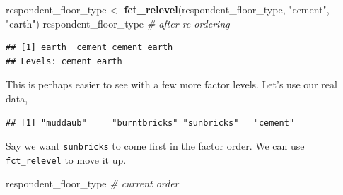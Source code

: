\documentclass[]{book}
\newenvironment{Shaded}{\begin{snugshade}}{\end{snugshade}}
\newcommand{\KeywordTok}[1]{\textcolor[rgb]{0.13,0.29,0.53}{\textbf{#1}}}
\newcommand{\StringTok}[1]{\textcolor[rgb]{0.31,0.60,0.02}{#1}}
\newcommand{\CommentTok}[1]{\textcolor[rgb]{0.56,0.35,0.01}{\textit{#1}}}
\newcommand{\OperatorTok}[1]{\textcolor[rgb]{0.81,0.36,0.00}{\textbf{#1}}}
\newcommand{\NormalTok}[1]{#1}
\begin{document}
\begin{Shaded}
\begin{Highlighting}[]
\NormalTok{respondent_floor_type <-}\StringTok{ }\KeywordTok{fct_relevel}\NormalTok{(respondent_floor_type, }\StringTok{"cement"}\NormalTok{, }\StringTok{"earth"}\NormalTok{)}
\NormalTok{respondent_floor_type }\CommentTok{# after re-ordering}
\end{Highlighting}
\end{Shaded}

\begin{verbatim}
## [1] earth  cement cement earth 
## Levels: cement earth
\end{verbatim}

This is perhaps easier to see with a few more factor levels. Let's use
our real data,

\begin{Shaded}
\end{Shaded}

\begin{verbatim}
## [1] "muddaub"     "burntbricks" "sunbricks"   "cement"
\end{verbatim}

Say we want \texttt{sunbricks} to come first in the factor order. We can
use \texttt{fct\_relevel} to move it up.

\begin{Shaded}
\begin{Highlighting}[]
\NormalTok{respondent_floor_type }\CommentTok{# current order}
\end{Highlighting}
\end{Shaded}
\end{document}
